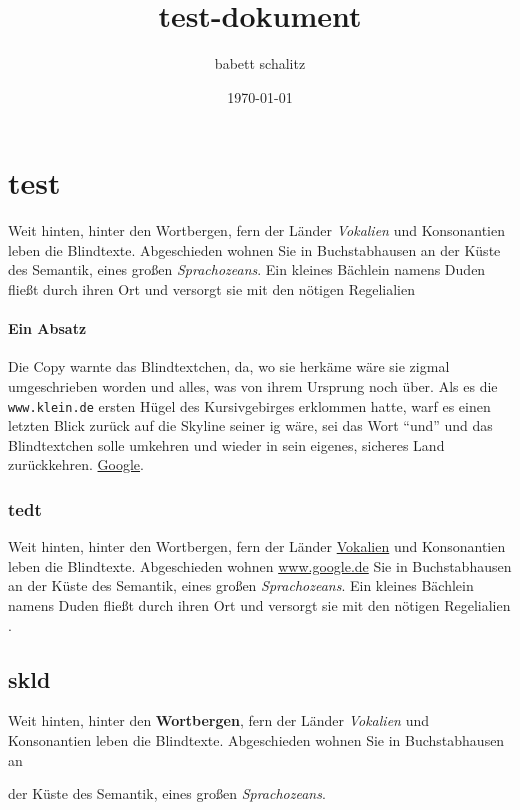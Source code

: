 \documentclass[%
	12pt,%
	a4paper,%
	oneside,%
	liststotoc, idxtotoc, bibtotoc, %
	parskip=half,%
	nochapterprefix,%
	appendixprefix, %
	headings=small,%
]{scrreprt}
\begin{document}
\title{test-dokument}
\date{\today}
\author{babett schalitz}
\maketitle

\section{test}

Weit hinten, hinter den Wortbergen, fern der Länder \textit{Vokalien} und Konsonantien leben die Blindtexte. Abgeschieden wohnen Sie in Buchstabhausen an der Küste des Semantik, eines großen \textsl{Sprachozeans}. Ein kleines Bächlein namens Duden fließt durch ihren Ort und versorgt sie mit den nötigen Regelialien %

\paragraph{Ein Absatz}
Die Copy warnte das Blindtextchen, da, wo sie herkäme wäre sie zigmal umgeschrieben worden und alles, was von ihrem Ursprung noch über. Als es die \nolinkurl{www.klein.de} ersten Hügel des Kursivgebirges erklommen hatte, warf es einen letzten Blick zurück auf die Skyline seiner ig wäre, sei das Wort "`und"'  und das Blindtextchen solle umkehren und wieder in sein eigenes, sicheres Land zurückkehren. \href{http://www.google.de}{Google}.

\subsubsection{tedt}
Weit hinten, hinter den \hypertarget{Linkziel}{Wortbergen}, fern der Länder \hyperlink{Linkziel}{Vokalien} und Konsonantien leben die Blindtexte. Abgeschieden wohnen \url{www.google.de} Sie in Buchstabhausen an der Küste des Semantik, eines großen \textsl{Sprachozeans}. Ein kleines Bächlein namens Duden  fließt durch ihren Ort und versorgt sie mit den nötigen Regelialien .

\subsection{skld}
Weit hinten, hinter den \textbf{Wortbergen}, fern der Länder \textit{Vokalien} und Konsonantien leben die Blindtexte. Abgeschieden wohnen Sie in Buchstabhausen an  der Küste des Semantik, eines großen \textsl{Sprachozeans}. 
\end{document}
